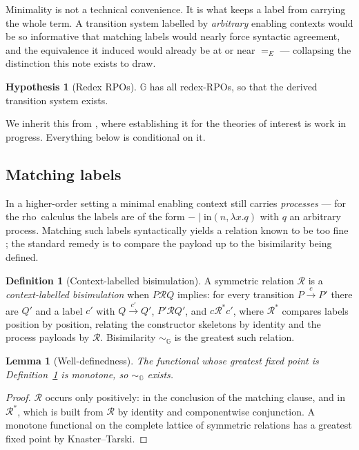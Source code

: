 \documentclass[11pt]{article}
\theoremstyle{plain}
\newtheorem{lemma}[theorem]{Lemma}
\theoremstyle{definition}
\newtheorem{definition}[theorem]{Definition}
\newtheorem{hypothesis}[theorem]{Hypothesis}
\newcommand{\rhoc}{\textsf{rho}}
\newcommand{\Gg}{\mathbb{G}}
\newcommand{\bis}{\sim}
\begin{document}
Minimality is not a technical convenience. It is what keeps a label from carrying the whole term. A
transition system labelled by \emph{arbitrary} enabling contexts would be so informative that matching
labels would nearly force syntactic agreement, and the equivalence it induced would already be at or
near $=_E$ --- collapsing the distinction this note exists to draw.

\begin{hypothesis}[Redex RPOs]
\label{hyp:rpo}
$\Gg$ has all redex-RPOs, so that the derived transition system exists.
\end{hypothesis}

We inherit this from \cite{BIHOL}, where establishing it for the theories of interest is work in
progress. Everything below is conditional on it.

\subsection{Matching labels}

In a higher-order setting a minimal enabling context still carries \emph{processes} --- for the \rhoc\
calculus the labels are of the form $-\mid \mathrm{in}(n,\lambda x.q)$ with $q$ an arbitrary process.
Matching such labels syntactically yields a relation known to be too fine \cite{SangiorgiHO}; the
standard remedy is to compare the payload up to the bisimilarity being defined.

\begin{definition}[Context-labelled bisimulation]
\label{def:bisim}
A symmetric relation $\mathcal{R}$ is a \emph{context-labelled bisimulation} when $P \mathrel{\mathcal{R}} Q$
implies: for every transition $P \xrightarrow{c} P'$ there are $Q'$ and a label $c'$ with
$Q \xrightarrow{c'} Q'$, $P' \mathrel{\mathcal{R}} Q'$, and $c \mathrel{\mathcal{R}^\ast} c'$, where
$\mathcal{R}^\ast$ compares labels position by position, relating the constructor skeletons by identity
and the process payloads by $\mathcal{R}$. Bisimilarity $\bis_\Gg$ is the greatest such relation.
\end{definition}

\begin{lemma}[Well-definedness]
\label{lem:monotone}
The functional whose greatest fixed point is Definition~\ref{def:bisim} is monotone, so $\bis_\Gg$
exists.
\end{lemma}

\begin{proof}
$\mathcal{R}$ occurs only positively: in the conclusion of the matching clause, and in
$\mathcal{R}^\ast$, which is built from $\mathcal{R}$ by identity and componentwise conjunction. A
monotone functional on the complete lattice of symmetric relations has a greatest fixed point by
Knaster--Tarski.
\end{proof}
\end{document}
